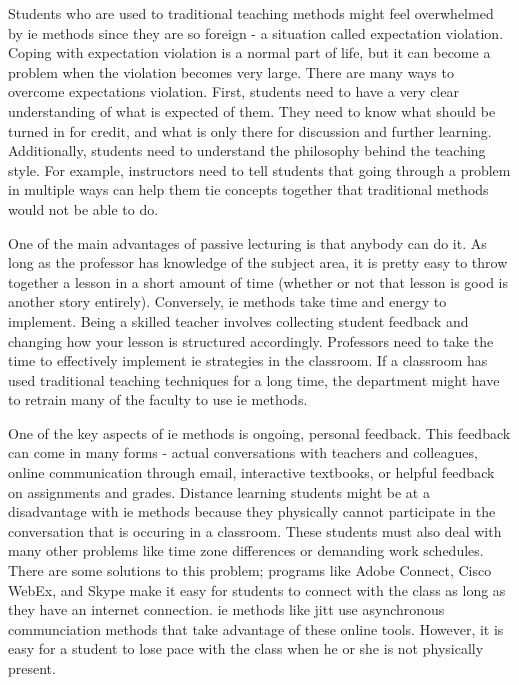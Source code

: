 Students who are used to traditional teaching methods might feel overwhelmed by \gls{ie} methods since they are so foreign - a situation called expectation violation. Coping with expectation violation is a normal part of life, but it can become a problem when the violation becomes very large. There are many ways to overcome expectations violation. First, students need to have a very clear understanding of what is expected of them. They need to know what should be turned in for credit, and what is only there for discussion and further learning. Additionally, students need to understand the philosophy behind the teaching style. For example, instructors need to tell students that going through a problem in multiple ways can help them tie concepts together that traditional methods would not be able to do.

One of the main advantages of passive lecturing is that anybody can do it. As long as the professor has knowledge of the subject area, it is pretty easy to throw together a lesson in a short amount of time (whether or not that lesson is good is another story entirely). Conversely, \gls{ie} methods take time and energy to implement. Being a skilled teacher involves collecting student feedback and changing how your lesson is structured accordingly. Professors need to take the time to effectively implement \gls{ie} strategies in the classroom. If a classroom has used traditional teaching techniques for a long time, the department might have to retrain many of the faculty to use \gls{ie} methods.

One of the key aspects of \gls{ie} methods is ongoing, personal feedback. This feedback can come in many forms - actual conversations with teachers and colleagues, online communication through email, interactive textbooks, or helpful feedback on assignments and grades. Distance learning students might be at a disadvantage with \gls{ie} methods because they physically cannot participate in the conversation that is occuring in a classroom. These students must also deal with many other problems like time zone differences or demanding work schedules. There are some solutions to this problem; programs like Adobe Connect, Cisco WebEx, and Skype make it easy for students to connect with the class as long as they have an internet connection. \gls{ie} methods like \gls{jitt} use asynchronous communciation methods that take advantage of these online tools. However, it is easy for a student to lose pace with the class when he or she is not physically present.
